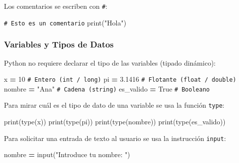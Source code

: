 \documentclass[
]{book}
\newenvironment{Shaded}{\begin{snugshade}}{\end{snugshade}}
\newcommand{\BuiltInTok}[1]{#1}
\newcommand{\CommentTok}[1]{\textcolor[rgb]{0.56,0.35,0.01}{\textit{#1}}}
\newcommand{\DecValTok}[1]{\textcolor[rgb]{0.00,0.00,0.81}{#1}}
\newcommand{\FloatTok}[1]{\textcolor[rgb]{0.00,0.00,0.81}{#1}}
\newcommand{\NormalTok}[1]{#1}
\newcommand{\OperatorTok}[1]{\textcolor[rgb]{0.81,0.36,0.00}{\textbf{#1}}}
\newcommand{\StringTok}[1]{\textcolor[rgb]{0.31,0.60,0.02}{#1}}
\newcommand{\VariableTok}[1]{\textcolor[rgb]{0.00,0.00,0.00}{#1}}
\theoremstyle{break}
\theoremstyle{nonumberplain}
\renewcommand{\CommentTok}[1]{\textcolor[rgb]{0.41,0.41,0.41}{\texttt{#1}}}
\begin{document}
Los comentarios se escriben con \texttt{\#}:

\begin{Shaded}
\begin{Highlighting}[]
\CommentTok{\# Esto es un comentario}
\BuiltInTok{print}\NormalTok{(}\StringTok{"Hola"}\NormalTok{)}
\end{Highlighting}
\end{Shaded}

\subsubsection{Variables y Tipos de Datos}\label{variables-y-tipos-de-datos}

Python no requiere declarar el tipo de las variables (tipado dinámico):

\begin{Shaded}
\begin{Highlighting}[]
\NormalTok{x }\OperatorTok{=} \DecValTok{10}            \CommentTok{\# Entero (int / long)}
\NormalTok{pi }\OperatorTok{=} \FloatTok{3.1416}       \CommentTok{\# Flotante (float / double)}
\NormalTok{nombre }\OperatorTok{=} \StringTok{"Ana"}    \CommentTok{\# Cadena (string)}
\NormalTok{es\_valido }\OperatorTok{=} \VariableTok{True}  \CommentTok{\# Booleano}
\end{Highlighting}
\end{Shaded}

Para mirar cuál es el tipo de dato de una variable se usa la función \texttt{type}:

\begin{Shaded}
\begin{Highlighting}[]
\BuiltInTok{print}\NormalTok{(}\BuiltInTok{type}\NormalTok{(x))}
\BuiltInTok{print}\NormalTok{(}\BuiltInTok{type}\NormalTok{(pi))}
\BuiltInTok{print}\NormalTok{(}\BuiltInTok{type}\NormalTok{(nombre))}
\BuiltInTok{print}\NormalTok{(}\BuiltInTok{type}\NormalTok{(es\_valido))}
\end{Highlighting}
\end{Shaded}

Para solicitar una entrada de texto al usuario se usa la instrucción \texttt{input}:

\begin{Shaded}
\begin{Highlighting}[]
\NormalTok{nombre }\OperatorTok{=} \BuiltInTok{input}\NormalTok{(}\StringTok{"Introduce tu nombre: "}\NormalTok{)}
\end{Highlighting}
\end{Shaded}
\end{document}
